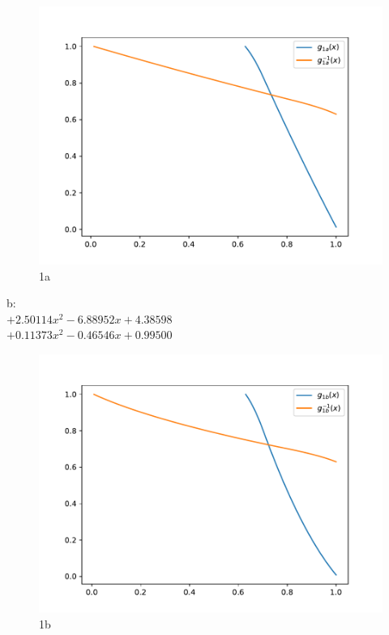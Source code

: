 \begin{figure}[H]
    \caption{1a}
        \hspace{-1cm}
        \includegraphics[scale=0.5]{template-fig/p0.pdf}
        \centering
\end{figure}

b:\\
$+2.50114x^2-6.88952x+4.38598$\\
$+0.11373x^2-0.46546x+0.99500$\\

\begin{figure}[H]
    \caption{1b}
        \hspace{-1cm}
        \includegraphics[scale=0.5]{template-fig/p1.pdf}
        \centering
\end{figure}
